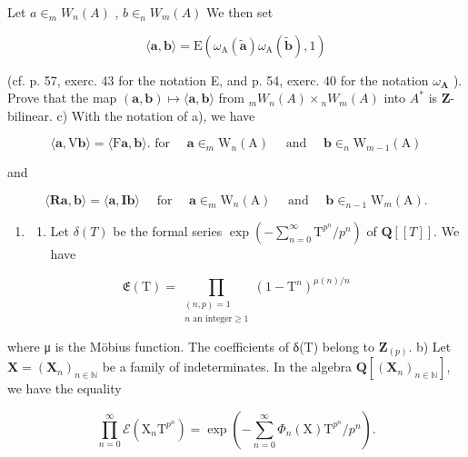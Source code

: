 Let \(a \in_{m} W_{n}(A)\) , \(b \in_{n} W_{m}(A)\) We then set

\[
\langle \boldsymbol {a}, \boldsymbol {b} \rangle = \mathrm{E} (\omega_ {\mathrm{A}} (\tilde {\boldsymbol {a}}) \omega_ {\mathrm{A}} (\tilde {\boldsymbol {b}}), 1)
\]

(cf. p. 57, exerc. 43 for the notation E, and p. 54, exerc. 40 for the notation \(\omega_{\mathbf{A}}\) ). Prove that the map \((\boldsymbol{a}, \boldsymbol{b}) \mapsto \langle \boldsymbol{a}, \boldsymbol{b} \rangle\) from \({}_{m}W_n(A) \times {}_{n}W_m(A)\) into \(A^*\) is \(\mathbf{Z}\)-bilinear. c) With the notation of a), we have

\[
\langle \boldsymbol {a}, \mathrm{V} \boldsymbol {b} \rangle = \langle \mathrm{F} \boldsymbol {a}, \boldsymbol {b} \rangle . \text { for } \quad \boldsymbol {a} \in_ {m} \mathrm{W} _ {n} (\mathrm{A}) \quad \text { and } \quad \boldsymbol {b} \in_ {n} \mathrm{W} _ {m - 1} (\mathrm{A})
\]

and

\[
\langle \mathbf {R} \boldsymbol {a}, \boldsymbol {b} \rangle = \langle \boldsymbol {a}, \mathbf {I} \boldsymbol {b} \rangle \quad \text { for } \quad \boldsymbol {a} \in_ {m} \mathrm{W} _ {n} (\mathrm{A}) \quad \text { and } \quad \boldsymbol {b} \in_ {n - 1} \mathrm{W} _ {m} (\mathrm{A}).
\]

\begin{enumerate}
\def\labelenumi{\arabic{enumi})}
\setcounter{enumi}{57}
\tightlist
\item
  \begin{enumerate}
  \def\labelenumii{\alph{enumii})}
  \tightlist
  \item
    Let \(\delta(T)\) be the formal series \(\exp\left(-\sum_{n=0}^{\infty}\mathrm{T}^{p^n}/p^n\right)\) of \(\mathbf{Q}[[T]]\). We have
  \end{enumerate}
\end{enumerate}

\[
\mathfrak{E}(\mathrm{T}) = \prod_{\substack{(n,p) = 1\\ n\text{ an integer}\geqslant 1}}(1 - \mathrm{T}^{n})^{\mu (n) / n}
\]

where μ is the Möbius function. The coefficients of δ(T) belong to \(\mathbf{Z}_{(p)}\). b) Let \(\mathbf{X} = (\mathbf{X}_{n})_{n \in \mathbb{N}}\) be a family of indeterminates. In the algebra \(\mathbf{Q}[(\mathbf{X}_{n})_{n \in \mathbb{N}}]\), we have the equality

\[
\prod_ {n = 0} ^ {\infty} \mathcal {E} (\mathrm{X} _ {n} \mathrm{T} ^ {p ^ {n}}) = \exp \left(- \sum_ {n = 0} ^ {\infty} \Phi_ {n} (\mathrm{X}) \mathrm{T} ^ {p ^ {n}} / p ^ {n}\right).
\]

